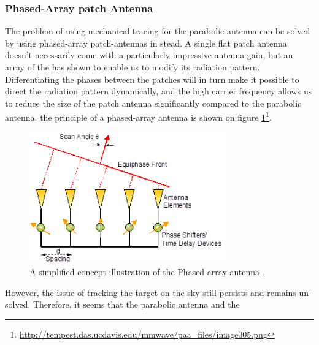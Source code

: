 \subsubsection{Phased-Array patch Antenna}
The problem of using mechanical tracing for the parabolic antenna can be solved by using phased-array patch-antennas in stead. A single flat patch antenna doesn't necessarily come with a particularly impressive antenna gain, but an array of the has shown to enable us to modify its radiation pattern. Differentiating the phases between the patches will in turn make it possible to direct the radiation pattern dynamically, and the high carrier frequency allows us to reduce the size of the patch antenna significantly compared to the parabolic antenna. the principle of a phased-array antenna is shown on figure \ref{fig:phased}\footnote{\url{http://tempest.das.ucdavis.edu/mmwave/paa_files/image005.png}}.\\
\begin{figure}[htb]
	\centering
	\includegraphics[width=0.75\textwidth]{figures/Rasmus/phased}
	\caption{A simplified concept illustration of the Phased array antenna .
	\label{fig:phased}}
\end{figure}
However, the issue of tracking the target on the sky still persists and remains un-solved. Therefore, it seems that the parabolic antenna and the 
